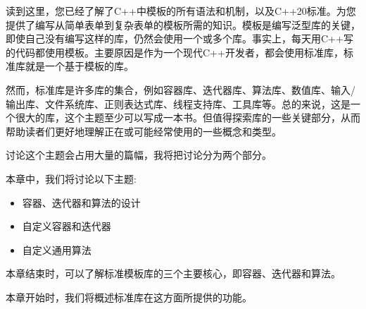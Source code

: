 读到这里，您已经了解了C++中模板的所有语法和机制，以及C++20标准。为您提供了编写从简单表单到复杂表单的模板所需的知识。模板是编写泛型库的关键，即使自己没有编写这样的库，仍然会使用一个或多个库。事实上，每天用C++写的代码都使用模板。主要原因是作为一个现代C++开发者，都会使用标准库，标准库就是一个基于模板的库。

然而，标准库是许多库的集合，例如容器库、迭代器库、算法库、数值库、输入/输出库、文件系统库、正则表达式库、线程支持库、工具库等。总的来说，这是一个很大的库，这个主题至少可以写成一本书。但值得探索库的一些关键部分，从而帮助读者们更好地理解正在或可能经常使用的一些概念和类型。

讨论这个主题会占用大量的篇幅，我将把讨论分为两个部分。

本章中，我们将讨论以下主题:

\begin{itemize}
\item
容器、迭代器和算法的设计

\item
自定义容器和迭代器

\item
自定义通用算法
\end{itemize}

本章结束时，可以了解标准模板库的三个主要核心，即容器、迭代器和算法。

本章开始时，我们将概述标准库在这方面所提供的功能。


